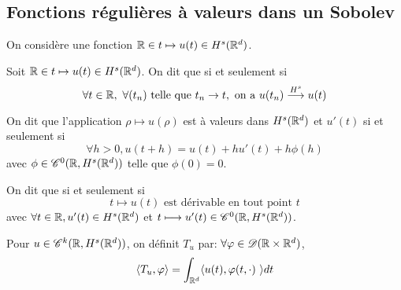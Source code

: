 \documentclass[french,a4paper,10pt]{article}
\begin{document}
        \subsection{Fonctions régulières à valeurs dans un Sobolev}\label{subsec:4}
            On considère une fonction $\mathbb{R} \in t \mapsto u(t) \in H^s(\mathbb{R}^d)$.

            \begin{definition}\label{def:2.4.1}
                Soit $\mathbb{R} \in t \mapsto u(t) \in H^s(\mathbb{R}^d)$. On dit que  si et seulement si 
                \begin{equation*}
                    \forall t \in \R, \ \forall (t_n) \text{ telle que } t_n \to t, \text{ on a } u(t_n) \stackrel{H^s}{\longrightarrow} u(t)
                \end{equation*}
            \end{definition}

            \begin{definition}\label{def:2.4.2}
                On dit que l'application $\rho \mapsto u(\rho)$ est  à valeurs dans $H^s(\mathbb{R}^d)$ et  $u'(t)$ si et seulement si
                \begin{equation*}
                    \forall h>0, u(t+h) = u(t)+hu'(t)+h\phi(h)
                \end{equation*}
                avec $\phi \in \mathscr{C}^0(\mathbb{R},H^s(\mathbb{R}^d))$ telle que $\phi(0)=0$.
            \end{definition}

            \begin{definition}\label{def:2.4.3}
                On dit que  si et seulement si
                \begin{equation*}
                    t \longmapsto u(t) \text{ est dérivable en tout point }t
                \end{equation*}
                avec $\forall t\in \mathbb{R}, u'(t) \in H^s(\mathbb{R}^d)$ et $t\longmapsto u'(t) \in \mathscr{C}^0(\mathbb{R},H^s(\mathbb{R}^d))$.
            \end{definition}

            Pour $u \in \mathscr{C}^k(\mathbb{R},H^s(\mathbb{R}^d))$, on définit $T_u$ par: $\forall \varphi \in \mathscr{D}(\mathbb{R} \times \mathbb{R}^d)$,
            \begin{equation*}
                \langle T_u,\varphi \rangle = \int_{\mathbb{R}^d} \langle u(t),\varphi(t,\cdot) \ \rangle dt
            \end{equation*}
\end{document}
